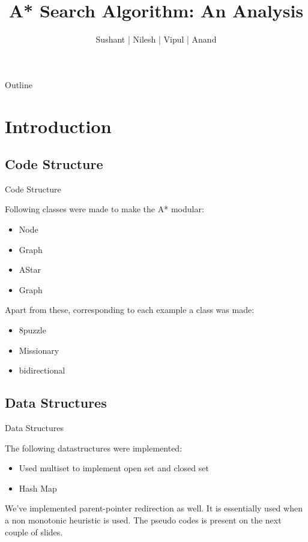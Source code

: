 \documentclass{beamer}
\title[AI Lab Report]{A* Search Algorithm: An Analysis}
\author{Sushant | Nilesh | Vipul | Anand}
\institute{Indian Institute of Technology, Bombay}
\begin{document}
\begin{frame}
  \titlepage
\end{frame}

\begin{frame}{Outline}
  \tableofcontents
\end{frame}

\section{Introduction}

\subsection{Code Structure}
\begin{frame}{Code Structure}

Following classes were made to make the A* modular:
\begin{itemize}
  \item Node
  \item Graph
  \item AStar
  \item Graph
\end{itemize}
Apart from these, corresponding to each example a class was made:
\begin{itemize}
  \item 8puzzle
  \item Missionary
  \item bidirectional

\end{itemize}
\end{frame}

\subsection{Data Structures}

\begin{frame}{Data Structures}

The following datastructures were implemented:
\begin{itemize}
\item Used multiset to implement open set and closed set
\item Hash Map
\end{itemize}

We've implemented parent-pointer redirection as well.
It is essentially used when a non monotonic heuristic is used.
The pseudo codes is present on the next couple of slides.
\end{frame}
\end{document}
